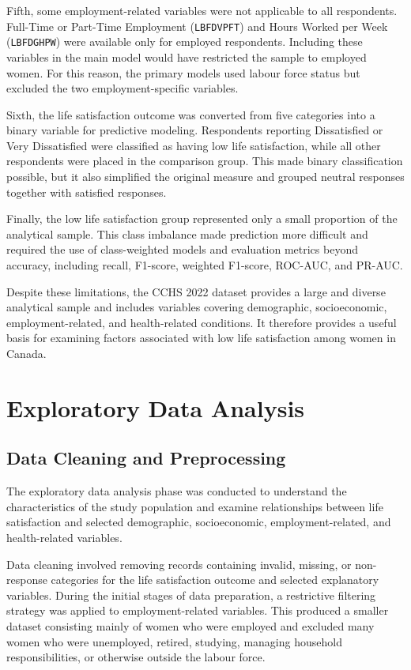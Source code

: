 \documentclass[12pt]{article}
\begin{document}
Fifth, some employment-related variables were not applicable to all respondents. Full-Time or Part-Time Employment (\texttt{LBFDVPFT}) and Hours Worked per Week (\texttt{LBFDGHPW}) were available only for employed respondents. Including these variables in the main model would have restricted the sample to employed women. For this reason, the primary models used labour force status but excluded the two employment-specific variables.

Sixth, the life satisfaction outcome was converted from five categories into a binary variable for predictive modeling. Respondents reporting Dissatisfied or Very Dissatisfied were classified as having low life satisfaction, while all other respondents were placed in the comparison group. This made binary classification possible, but it also simplified the original measure and grouped neutral responses together with satisfied responses.

Finally, the low life satisfaction group represented only a small proportion of the analytical sample. This class imbalance made prediction more difficult and required the use of class-weighted models and evaluation metrics beyond accuracy, including recall, F1-score, weighted F1-score, ROC-AUC, and PR-AUC.

Despite these limitations, the CCHS 2022 dataset provides a large and diverse analytical sample and includes variables covering demographic, socioeconomic, employment-related, and health-related conditions. It therefore provides a useful basis for examining factors associated with low life satisfaction among women in Canada.

\section{Exploratory Data Analysis}

\subsection{Data Cleaning and Preprocessing}

The exploratory data analysis phase was conducted to understand the characteristics of the study population and examine relationships between life satisfaction and selected demographic, socioeconomic, employment-related, and health-related variables.

Data cleaning involved removing records containing invalid, missing, or non-response categories for the life satisfaction outcome and selected explanatory variables. During the initial stages of data preparation, a restrictive filtering strategy was applied to employment-related variables. This produced a smaller dataset consisting mainly of women who were employed and excluded many women who were unemployed, retired, studying, managing household responsibilities, or otherwise outside the labour force.
\end{document}
